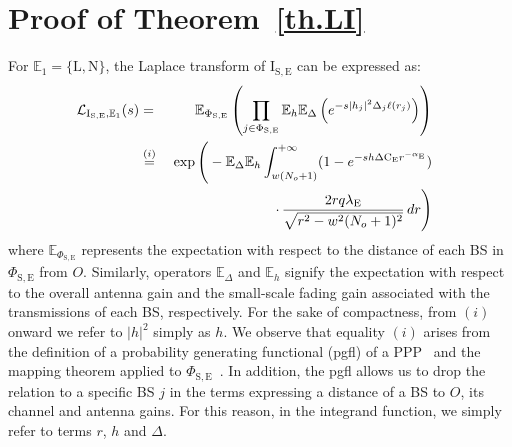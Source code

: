\documentclass[10pt,journal,a4paper]{IEEEtran}
\begin{document}
\vspace{-5mm}\appendices\section{Proof of Theorem~\ref{th.LI}}\label{app.A}
For $\mathbb{E}_1 = \{\mathrm{L},\mathrm{N}\}$, the Laplace transform of $\mathrm{I}_{\mathrm{S,E}}$ can be expressed as:
\setlength{\arraycolsep}{0.0em} 
\vspace{-3mm}\begin{eqnarray}
\hspace{-3mm}\mathcal{L}_{\mathrm{I}_{\mathrm{S,E}},\mathbb{E}_1}(s) &{}={}& \mathbb{E}_{\Phi_{\mathrm{S,E}}} \left( \prod_{j \in \Phi_{\mathrm{S,E}}} \mathbb{E}_h \mathbb{E}_\Delta \left( e^{-s |h_j|^2 \Delta_j \ell(r_j)} \right)\right)\label{eq.app.p1.1}\\
&{}\stackrel{(i)}{=}{}& \exp \Bigg(- \mathbb{E}_\Delta \mathbb{E}_h \int_{w(N_o+1)}^{+\infty} (1-e^{-s h \Delta \mathrm{C_E} r^{-\alpha_\mathrm{E}}})\nonumber\\
&& \cdot \, \frac{2 r q \lambda_\mathrm{E}}{\sqrt{r^2 - w^2(N_o+1)^2}} \, dr \Bigg)\label{eq.app.p1.1_}
\end{eqnarray}
where $\mathbb{E}_{\Phi_{\mathrm{S,E}}}$ represents the expectation with respect to the distance of each BS in $\Phi_{\mathrm{S,E}}$ from $O$. Similarly, operators $\mathbb{E}_\Delta$ and $\mathbb{E}_h$ signify the expectation with respect to the overall antenna gain and the small-scale fading gain associated with the transmissions of each BS, respectively.
For the sake of compactness, from $(i)$ onward we refer to $|h|^2$ simply as $h$.
We observe that equality $(i)$ arises from the definition of a probability generating functional (pgfl) of a PPP~\cite[Definition~4.3]{haenggi2013stochastic} and the mapping theorem applied to $\Phi_{\mathrm{S,E}}$~\cite[Theorem~2.34]{haenggi2013stochastic}. In addition, the pgfl allows us to drop the relation to a specific BS $j$ in the terms expressing a distance of a BS to $O$, its channel and antenna gains. For this reason, in the integrand function, we simply refer to terms $r$, $h$ and $\Delta$.
\end{document}
